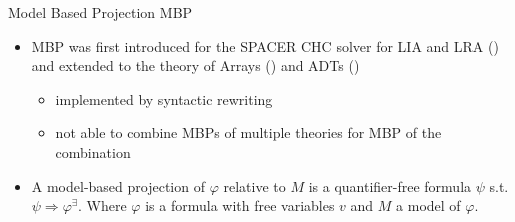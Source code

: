 \documentclass{beamer}
\begin{document}

\begin{frame}{Model Based Projection MBP}
\begin{itemize}
    \item MBP was first introduced for the SPACER CHC solver for LIA and LRA (\cite{17}) and extended to the theory of Arrays (\cite{16}) and ADTs (\cite{5})
    \begin{itemize}
        \item implemented by syntactic rewriting
        \item not able to combine MBPs of multiple theories for MBP of the combination
    \end{itemize}
    \pause
    \item A model-based projection of $\varphi$ relative to $M$ is a quantifier-free formula $\psi$ s.t. $\psi \Longrightarrow \varphi^{\exists}$. Where $\varphi$ is a formula with free variables $v$ and $M$ a model of $\varphi$.
\end{itemize}
\end{frame}
\end{document}
